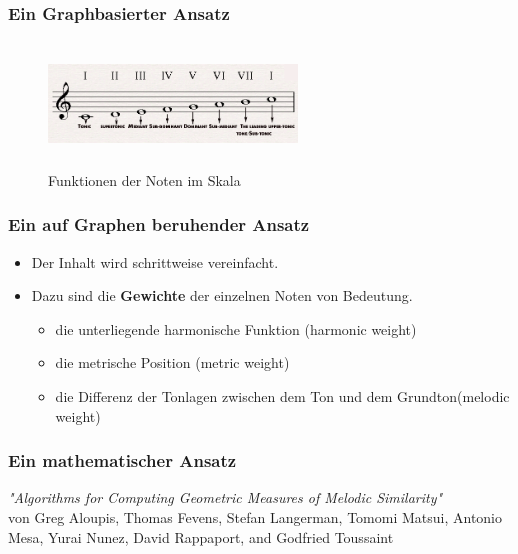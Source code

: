 \documentclass{beamer}
\begin{document}
	\begin{frame}
		\frametitle{Ein Graphbasierter Ansatz}
		\begin{figure}[h!]
			\includegraphics[width=250px,height=125px,keepaspectratio]{functional_degrees}
			\caption{Funktionen der Noten im Skala \cite{functional_degrees_source}} 
		\end{figure}
	\end{frame}


	\begin{frame}
		\frametitle{Ein auf Graphen beruhender Ansatz}
		\begin{itemize}
				\item Der Inhalt wird schrittweise vereinfacht.
				\item Dazu sind die \textbf{Gewichte} der einzelnen Noten von Bedeutung.
					\begin{itemize}
						\item die unterliegende harmonische Funktion (harmonic weight)
						\item die metrische Position (metric weight)
						\item die Differenz der Tonlagen zwischen dem Ton und dem Grundton(melodic weight)
					\end{itemize}
		\end{itemize}
	\end{frame}
	
    \begin{frame}
		\frametitle{Ein mathematischer Ansatz}
		\begin{minipage}{0.45\textwidth}
			\begin{center}
				\textit{"Algorithms for Computing Geometric Measures of Melodic Similarity"} 
				\cite{one}  \\ 
				von Greg Aloupis, Thomas Fevens, Stefan Langerman, Tomomi Matsui, Antonio Mesa, Yurai Nunez, David Rappaport, and Godfried Toussaint
			\end{center}
		\end{minipage}%
		\begin{minipage}{0.45\textwidth}
			\begin{figure}[h!]
			\end{figure}
		\end{minipage}
	\end{frame}
	
\end{document}
